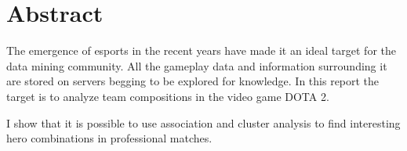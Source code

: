 \documentclass[result.tex]{subfiles}
\begin{document}
\section*{\centering Abstract}

The emergence of esports in the recent years have made it an ideal target for the data mining community. All the gameplay data and information surrounding it are stored on servers begging to be explored for knowledge. In this report the target is to analyze team compositions in the video game DOTA 2.

I show that it is possible to use association and cluster analysis to find interesting hero combinations in professional matches.
\end{document}
